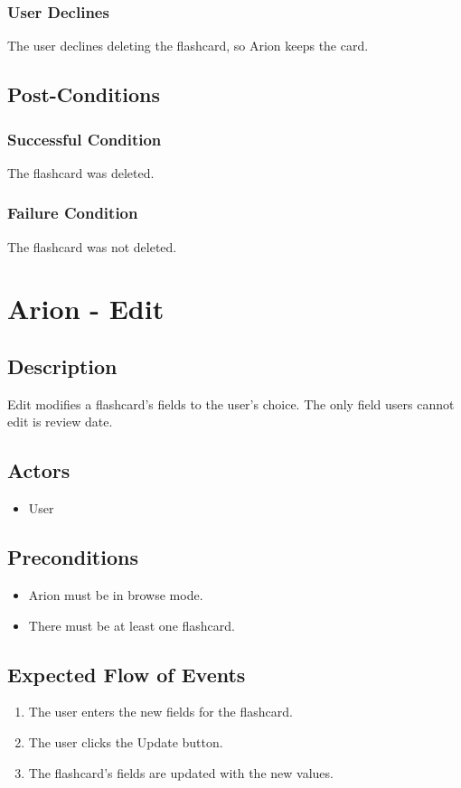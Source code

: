\documentclass{scrreprt}
\begin{document}
    \subsection{User Declines}
    The user declines deleting the flashcard, so Arion keeps the card.

\section{Post-Conditions}
    \subsection{Successful Condition}
    The flashcard was deleted.
    
    \subsection{Failure Condition}
    The flashcard was not deleted.


\chapter{Arion - Edit}

\section{Description}
Edit modifies a flashcard's fields to the user's choice.
The only field users cannot edit is review date.

\section{Actors}
\begin{itemize}
    \item User
\end{itemize}

\section{Preconditions}
\begin{itemize}
    \item Arion must be in browse mode.
    \item There must be at least one flashcard.
\end{itemize}

\section{Expected Flow of Events}
\begin{enumerate}[1.]
    \item The user enters the new fields for the flashcard.
    \item The user clicks the Update button.
    \item The flashcard's fields are updated with the new values.
\end{enumerate}
\end{document}
